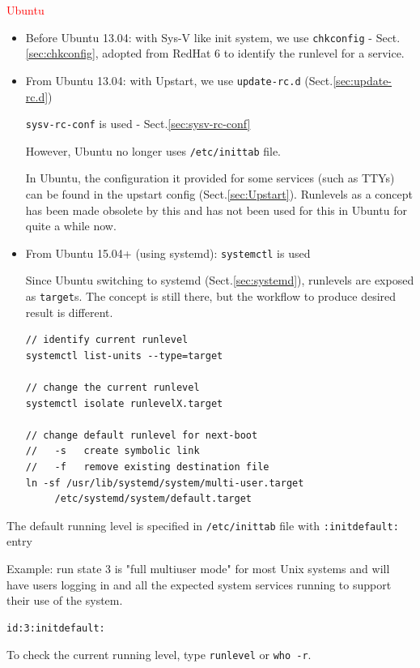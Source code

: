 \textcolor{red}{Ubuntu}
\begin{itemize}
  \item Before Ubuntu 13.04: with Sys-V like init system,  we use
  \verb!chkconfig! - Sect.\ref{sec:chkconfig}, adopted from RedHat 6 to identify
  the runlevel for a service. 
    
  \item From Ubuntu 13.04:  with Upstart, we use \verb!update-rc.d!
  (Sect.\ref{sec:update-rc.d})
  
  \verb!sysv-rc-conf! is used - Sect.\ref{sec:sysv-rc-conf}

However, Ubuntu no longer uses \verb!/etc/inittab! file.

In Ubuntu, the configuration it provided for some services (such as TTYs) can be
found in the upstart config (Sect.\ref{sec:Upstart}). Runlevels as a concept has
been made obsolete by this and has not been used for this in Ubuntu for quite a
while now.

  \item From Ubuntu 15.04+ (using systemd): \verb!systemctl! is used
  
Since Ubuntu switching to systemd (Sect.\ref{sec:systemd}), runlevels are
exposed as \verb!target!s. The concept is still there, but the workflow to
produce desired result is different.


\begin{verbatim}
// identify current runlevel
systemctl list-units --type=target

// change the current runlevel
systemctl isolate runlevelX.target

// change default runlevel for next-boot
//   -s   create symbolic link
//   -f   remove existing destination file
ln -sf /usr/lib/systemd/system/multi-user.target 
     /etc/systemd/system/default.target
\end{verbatim}

\end{itemize}



The default running level is specified in \verb!/etc/inittab! file with
\verb!:initdefault:! entry

Example: run state 3 is "full multiuser mode" for most Unix systems and will
have users logging in and all the expected system services running to support their use of the system.
\begin{verbatim}
id:3:initdefault:
\end{verbatim}

To check the current running level, type \verb!runlevel! or \verb!who -r!.

